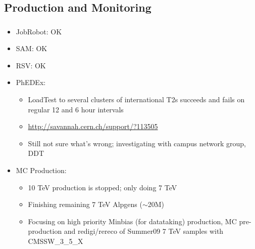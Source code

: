 \documentclass{beamer}
\newcommand{\ca}{\ensuremath{\sim}}
\begin{document}
\subsection{Production and Monitoring}
\begin{frame}
\frametitle{}

\begin{itemize}
	\item JobRobot: OK
	\item SAM: OK
	\item RSV: OK
	\item PhEDEx:
	\begin{itemize}
		\item LoadTest to several clusters of international T2s succeeds and fails on regular 12 and 6 hour intervals
		\item \url{http://savannah.cern.ch/support/?113505}
		\item Still not sure what's wrong; investigating with campus network group, DDT
	\end{itemize}
	\item MC Production:
	\begin{itemize}
		\item 10 TeV production is stopped; only doing 7 TeV
		\item Finishing remaining 7 TeV Alpgens (\ca{}20M) 
		\item Focusing on high priority Minbias (for datataking) production, MC pre-production and redigi/rereco of Summer09 7 TeV samples with CMSSW\_3\_5\_X
	\end{itemize}
\end{itemize}
\end{frame}
\end{document}
